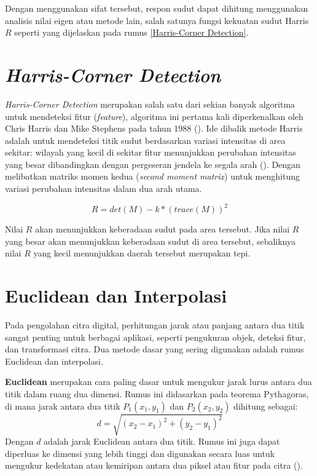 Dengan menggunakan sifat tersebut, respon sudut dapat dihitung menggunakan analisis nilai eigen atau metode lain, salah satunya fungsi kekuatan sudut Harris \(R\) seperti yang dijelaskan pada rumus \ref{Harris-Corner Detection}.

\section{\emph{Harris-Corner Detection}}
  \emph{Harris-Corner Detection} merupakan salah satu dari sekian banyak algoritma untuk mendeteksi fitur (\emph{feature}), algoritma ini pertama kali diperkenalkan oleh Chris Harris dan Mike Stephens pada tahun 1988 (\cite{Harris2013}). 
Ide dibalik metode Harris adalah untuk mendeteksi titik sudut berdasarkan variasi intensitas di area sekitar: wilayah yang kecil di sekitar fitur menunjukkan perubahan intensitas yang besar dibandingkan dengan pergeseran jendela ke segala arah (\cite[hlm. 305--308]{Sanchez2018}).
Dengan melibatkan matriks momen kedua (\emph{second moment matrix}) untuk menghitung variasi perubahan intensitas dalam dua arah utama.

\begin{equation}
  R = det(M) - k * (trace(M))^2
  \label{Harris-Corner Detection}
\end{equation}

  Nilai \(R\) akan menunjukkan keberadaan sudut pada area tersebut. 
Jika nilai \(R\) yang besar akan menunjukkan keberadaan sudut di area tersebut, sebaliknya nilai \(R\) yang kecil menunjukkan daerah tersebut merupakan tepi.

\section{Euclidean dan Interpolasi}
  Pada pengolahan citra digital, perhitungan jarak atau panjang antara dua titik sangat penting untuk berbagai aplikasi, seperti pengukuran objek, deteksi fitur, dan transformasi citra. Dua metode dasar yang sering digunakan adalah rumus Euclidean dan interpolasi.

  \textbf{Euclidean} merupakan cara paling dasar untuk mengukur jarak lurus antara dua titik dalam ruang dua dimensi. Rumus ini didasarkan pada teorema Pythagoras, di mana jarak antara dua titik \(P_1(x_1, y_1)\) dan \(P_2(x_2, y_2)\) dihitung sebagai:
\begin{equation}
  d = \sqrt{(x_2 - x_1)^2 + (y_2 - y_1)^2}
  \label{eq:euclidean}
\end{equation}
  Dengan \(d\) adalah jarak Euclidean antara dua titik. Rumus ini juga dapat diperluas ke dimensi yang lebih tinggi dan digunakan secara luas untuk mengukur kedekatan atau kemiripan antara dua piksel atau fitur pada citra (\cite[hlm. 34]{Gonzalez2018}).

